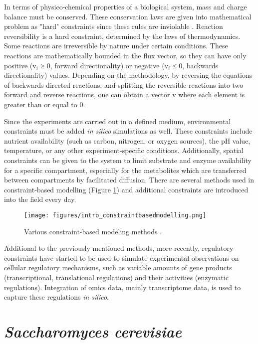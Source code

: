 In terms of physico-chemical properties of a biological system, mass and charge balance must be conserved. These conservation laws are given into mathematical problem as "hard" constraints since these rules are inviolable \cite{price2004genome}. Reaction reversibility is a hard constraint, determined by the laws of thermodynamics. Some reactions are irreversible by nature under certain conditions. These reactions are mathematically bounded in the flux vector, so they can have only positive (v$_i$ ≥ 0, forward directionality) or negative (v$_i$ ≤ 0, backwards directionality) values. Depending on the methodology, by reversing the equations of backwards-directed reactions, and splitting the reversible reactions into two forward and reverse reactions, one can obtain a vector v where each element is greater than or equal to 0.

Since the experiments are carried out in a defined medium, environmental constraints must be added \emph{in silico} simulations as well. These constraints include nutrient availability (such as carbon, nitrogen, or oxygen sources), the pH value, temperature, or any other experiment-specific conditions. Additionally, spatial constraints can be given to the system to limit substrate and enzyme availability for a specific compartment, especially for the metabolites which are transferred between compartments by facilitated diffusion. There are several methods used in constraint-based modelling (Figure \ref{fig:intro_constraintbasedmodelling}) and additional constraints are introduced into the field every day.
\begin{figure}[H]
\begin{center}
\texttt{[image: figures/intro\_constraintbasedmodelling.png]}
\end{center}
\caption[Various constraint-based modeling methods]{Various constraint-based modeling methods \cite{lewis2012constraining}.}
\label{fig:intro_constraintbasedmodelling}
\end{figure}
\vspace{-0.5cm}
Additional to the previously mentioned methods, more recently, regulatory constraints have started to be used to simulate experimental observations on cellular regulatory mechanisms, such as variable amounts of gene products (transcriptional, translational regulations) and their activities (enzymatic regulations). Integration of omics data, mainly transcriptome data, is used to capture these regulations \emph{in silico}.

\section{\emph{Saccharomyces cerevisiae}}

